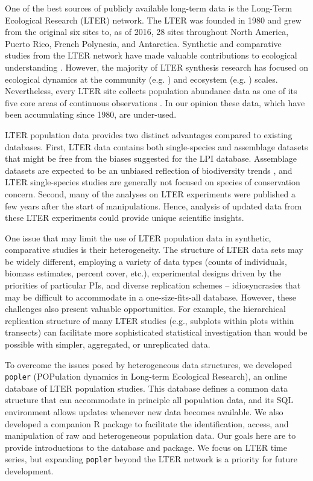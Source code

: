 \documentclass{article}\usepackage[]{graphicx}\usepackage[]{color}
\begin{document}
One of the best sources of publicly available long-term data is the Long-Term Ecological Research (LTER) network. The LTER was founded in 1980 and grew from the original six sites to, as of 2016, 28 sites throughout North America, Puerto Rico, French Polynesia, and Antarctica. Synthetic and comparative studies from the LTER network have made valuable contributions to ecological understanding \citep{Knapp2012}. However, the majority of LTER synthesis research has focused on ecological dynamics at the community (e.g. \cite{Wilcox2017}) and ecosystem (e.g. \cite{Knapp2001}) scales. Nevertheless, every LTER site collects population abundance data as one of its five core areas of continuous observations \citep{Callahan1984}. In our opinion these data, which have been accumulating since 1980, are under-used.

LTER population data provides two distinct advantages compared to existing databases. First, LTER data contains both single-species and assemblage datasets that might be free from the biases suggested for the LPI database. Assemblage datasets are expected to be an unbiased reflection of biodiversity trends \citep{dornelas2018biotime}, and LTER single-species studies are generally not focused on species of conservation concern. Second, many of the analyses on LTER experiments were published a few years after the start of manipulations. Hence, analysis of updated data from these LTER experiments could provide unique scientific insights.

One issue that may limit the use of LTER population data in synthetic, comparative studies is their heterogeneity. The structure of LTER data sets may be widely different, employing a variety of data types (counts of individuals, biomass estimates, percent cover, etc.), experimental designs driven by the priorities of particular PIs, and diverse replication schemes – idiosyncrasies that may be difficult to accommodate in a one-size-fits-all database. However, these challenges also present valuable opportunities. For example, the hierarchical replication structure of many LTER studies (e.g., subplots within plots within transects) can facilitate more sophisticated statistical investigation than would be possible with simpler, aggregated, or unreplicated data. %

To overcome the issues posed by heterogeneous data structures, we developed \texttt{popler} (POPulation dynamics in Long-term Ecological Research), an online database of LTER population studies. This database defines a common data structure that can accommodate in principle all population data, and its SQL environment allows updates whenever new data becomes available. We also developed a companion R package to facilitate the identification, access, and manipulation of raw and heterogeneous population data. Our goals here are to provide introductions to the database and package. We focus on LTER time series, but expanding \texttt{popler} beyond the LTER network is a priority for future development.
\end{document}

